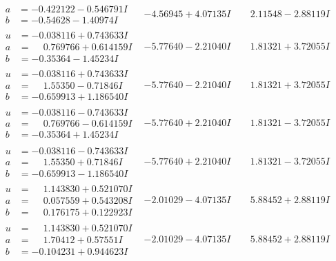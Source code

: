 \documentclass[1p]{elsarticle_modified}
\theoremstyle{definition}
\begin{document}
$$\begin{array}{c|c|c}
\begin{aligned}
a &= -0.422122 - 0.546791 I \\
b &= -0.54628 - 1.40974 I\end{aligned}
 & -4.56945 + 4.07135 I & \phantom{-}2.11548 - 2.88119 I \\ \hline\begin{aligned}
u &= -0.038116 + 0.743633 I \\
a &= \phantom{-}0.769766 + 0.614159 I \\
b &= -0.35364 - 1.45234 I\end{aligned}
 & -5.77640 - 2.21040 I & \phantom{-}1.81321 + 3.72055 I \\ \hline\begin{aligned}
u &= -0.038116 + 0.743633 I \\
a &= \phantom{-}1.55350 - 0.71846 I \\
b &= -0.659913 + 1.186540 I\end{aligned}
 & -5.77640 - 2.21040 I & \phantom{-}1.81321 + 3.72055 I \\ \hline\begin{aligned}
u &= -0.038116 - 0.743633 I \\
a &= \phantom{-}0.769766 - 0.614159 I \\
b &= -0.35364 + 1.45234 I\end{aligned}
 & -5.77640 + 2.21040 I & \phantom{-}1.81321 - 3.72055 I \\ \hline\begin{aligned}
u &= -0.038116 - 0.743633 I \\
a &= \phantom{-}1.55350 + 0.71846 I \\
b &= -0.659913 - 1.186540 I\end{aligned}
 & -5.77640 + 2.21040 I & \phantom{-}1.81321 - 3.72055 I \\ \hline\begin{aligned}
u &= \phantom{-}1.143830 + 0.521070 I \\
a &= \phantom{-}0.057559 + 0.543208 I \\
b &= \phantom{-}0.176175 + 0.122923 I\end{aligned}
 & -2.01029 - 4.07135 I & \phantom{-}5.88452 + 2.88119 I \\ \hline\begin{aligned}
u &= \phantom{-}1.143830 + 0.521070 I \\
a &= \phantom{-}1.70412 + 0.57551 I \\
b &= -0.104231 + 0.944623 I\end{aligned}
 & -2.01029 - 4.07135 I & \phantom{-}5.88452 + 2.88119 I\\

\end{array}$$
\end{document}
